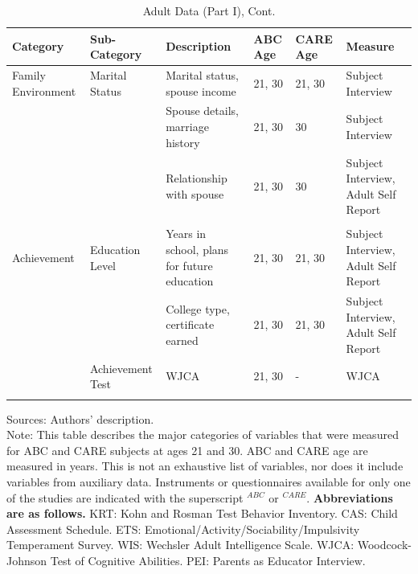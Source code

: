 \documentclass[static]{JJH-Beamer}
\begin{document}
\clearpage
\begin{frame}
 \addtocounter{framenumber}{-1}

\begin{table}[H]
\addtocounter{table}{-1}
\caption{Adult Data (Part I), Cont.}						
\begin{center}
\begin{tiny}							
\begin{tabular}{L{1.2cm} C{1.4cm} C{2.5cm} C{.8cm} C{.8cm} C{2.9cm}}										
\toprule
\textbf{Category}	&	\textbf{Sub-Category}	&	\textbf{Description}	&	\textbf{ABC Age}  	&  \textbf{CARE Age}  & 	\textbf{Measure}	\\ \midrule								
Family Environment      	&	       Marital Status  	&	       Marital status, spouse income       	&	       21, 30  	&	21, 30	&	       Subject Interview       \\
        	&	               	&	       Spouse details, marriage history	&	       21, 30  	&	30	&	       Subject Interview       \\
        	&	               	&	       Relationship with spouse        	&	       21, 30  	&	30	&	       Subject Interview, Adult Self Report    \\
\\										
 Achievement   	&	       Education Level 	&	       Years in school, plans for future education      	&	       21, 30  	&	       21, 30  	&	       Subject Interview, Adult Self Report    \\
        	&	               	&	       College type, certificate earned        	&	       21, 30  	&	       21, 30  	&	       Subject Interview, Adult Self Report    \\
	&	Achievement Test	&	       WJCA    	&	       21, 30  	&	-	&	       WJCA    \\
	&		&							\\
\bottomrule							
\end{tabular}										
\end{tiny}
\end{center}							
\end{table}

\end{frame}

{\flushleft \normalsize Sources: Authors' description. \\				
Note: This table describes the major categories of variables that were measured for ABC and CARE subjects at ages 21 and 30. ABC and CARE age are measured in years. This is not an exhaustive list of variables, nor does it include variables from auxiliary data. Instruments or questionnaires available for only one of the studies are indicated with the superscript $^{ABC}$ or $^{CARE}$. \textbf{Abbreviations are as follows.} KRT: Kohn and Rosman Test Behavior Inventory. CAS: Child Assessment Schedule. ETS: Emotional/Activity/Sociability/Impulsivity Temperament Survey. WIS: Wechsler Adult Intelligence Scale. WJCA: Woodcock-Johnson Test of Cognitive Abilities. PEI: Parents as Educator Interview.\\}
\end{document}
